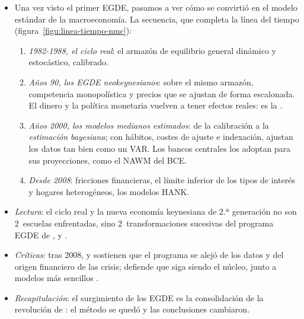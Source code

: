 \documentclass[11pt]{article}
\begin{document}
\begin{itemize}
\item Una vez visto el primer EGDE, pasamos a ver cómo se convirtió en el modelo estándar de la macroeconomía. La secuencia, que completa la línea del tiempo (figura~\ref{figu:linea-tiempo-nmc}):
  \begin{enumerate}
  \item \emph{1982-1988, el ciclo real}: el armazón de equilibrio general dinámico y estocástico, calibrado\nocite{KydlandPrescott1982Time,LongPlosser1983Real,Prescott1986}.
  \item \emph{Años 90, los EGDE neokeynesianos}: sobre el mismo armazón, competencia monopolística y precios que se ajustan de forma escalonada. El dinero y la política monetaria vuelven a tener efectos reales: es la \nocite{GoodfriendKing1997New,RotembergWoodford1997Optimization} .
  \item \emph{Años 2000, los modelos medianos estimados}: de la calibración a la \emph{estimación bayesiana}; con hábitos, costes de ajuste e indexación, ajustan los datos tan bien como un VAR\nocite{ChristianoEichenbaumEvans2005,SmetsWouters2003Estimated,SmetsWouters2007Shocks}. Los bancos centrales los adoptan para sus proyecciones, como el NAWM del BCE\nocite{ChristoffelCoenenWarne2008}.
  \item \emph{Desde 2008}: fricciones financieras\nocite{BernankeGertlerGilchrist1999}, el límite inferior de los tipos de interés y hogares heterogéneos, los modelos HANK\nocite{KaplanMollViolante2018Monetary}.
  \end{enumerate}
\item \emph{Lectura}: el ciclo real y la nueva economía keynesiana de 2.ª generación no son 2~escuelas enfrentadas, sino 2~transformaciones sucesivas del programa EGDE de ,  y \nocite{DeVroey2016History}.
\item \emph{Críticas}: tras 2008, \nocite{Romer2016Trouble} y \textcite{Stiglitz2018Wrong} sostienen que el programa se alejó de los datos y del origen financiero de las crisis; \textcite{Blanchard2018Future} defiende que siga siendo el núcleo, junto a modelos más sencillos  .
\item \emph{Recapitulación}: el surgimiento de los EGDE es la consolidación de la revolución de : el método se quedó y las conclusiones cambiaron.
\end{itemize}
\end{document}
